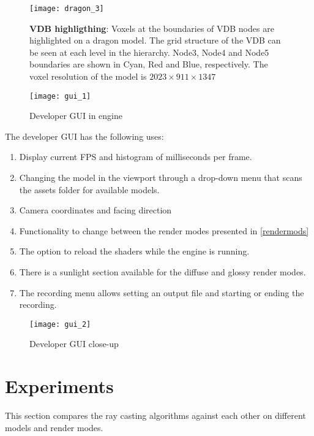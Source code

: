 \begin{figure}[H]
  \centering
  \texttt{[image: dragon\_3]}
  \caption{\textbf{VDB highligthing}: Voxels at the boundaries of VDB nodes are highlighted on a dragon model. The grid structure of the VDB can be seen at each level in the hierarchy. Node3, Node4 and Node5 boundaries are shown in Cyan, Red and Blue, respectively. The voxel resolution of the model is $2023\times911\times1347$}
\end{figure}

\begin{multicols}{2}[]
  \begin{figure}[H]
    \centering
    \texttt{[image: gui\_1]}
    \caption{Developer GUI in engine}
  \end{figure}
  The developer GUI has the following uses:
  \begin{enumerate}[itemstep=0mm]
    \item Display current \acrshort{FPS} and histogram of milliseconds per frame.
    \item Changing the model in the viewport through a drop-down menu that scans the assets folder for available models.
    \item Camera coordinates and facing direction
    \item Functionality to change between the render modes presented in \cref{rendermods}
    \item The option to reload the shaders while the engine is running.
    \item There is a sunlight section available for the diffuse and glossy render modes.
    \item The recording menu allows setting an output file and starting or ending the recording.
  \end{enumerate}
  \columnbreak
  \begin{figure}[H]
    \centering
    \texttt{[image: gui\_2]}
    \caption{Developer GUI close-up}
    \label{gui}
  \end{figure}
\end{multicols}

\section{Experiments}
This section compares the ray casting algorithms against each other on different models and render modes.


